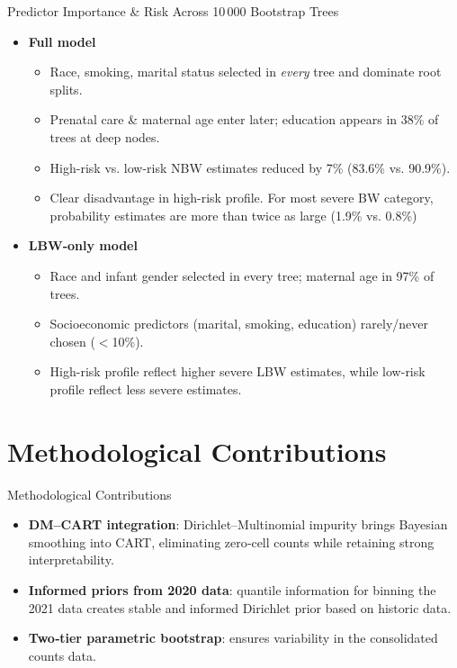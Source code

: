 \documentclass[aspectratio=169,professionalfonts]{beamer}
\begin{document}
\begin{frame}{Predictor Importance \& Risk Across 10\,000 Bootstrap Trees}
\begin{itemize}
  \item \textbf{Full model}
        \begin{itemize}
            \item Race, smoking, marital status selected in \emph{every} tree and dominate root splits.
            \item Prenatal care \& maternal age enter later; education appears in 38\% of trees at deep nodes.
            \item High-risk vs. low-risk NBW estimates reduced by 7\% (83.6\% vs. 90.9\%).
            \item Clear disadvantage in high-risk profile. For most severe BW category, probability estimates are more than twice as large (1.9\% vs. 0.8\%)
        \end{itemize}
  \item \textbf{LBW‑only model}
        \begin{itemize}
            \item Race and infant gender selected in every tree; maternal age in 97\% of trees.
            \item Socioeconomic predictors (marital, smoking, education) rarely/never chosen ($<$10\%).
            \item High-risk profile reflect higher severe LBW estimates, while low-risk profile reflect less severe estimates.
        \end{itemize}
\end{itemize}
\end{frame}

\section{Methodological Contributions}

\begin{frame}{Methodological Contributions}
\small
\begin{itemize}
  \item \textbf{DM–CART integration}: Dirichlet–Multinomial impurity brings Bayesian smoothing into CART, eliminating zero‑cell counts while retaining strong interpretability.
  \item \textbf{Informed priors from 2020 data}: quantile information for binning the 2021 data creates stable and informed Dirichlet prior based on historic data.
  \item \textbf{Two‑tier parametric bootstrap}: ensures variability in the consolidated counts data.
\end{itemize}
\end{frame}
\end{document}

